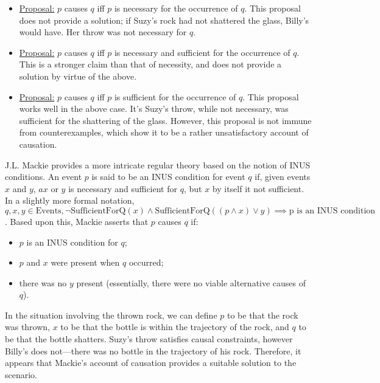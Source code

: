 \documentclass{article}
\begin{document}
    \begin{itemize}
    \item \underline{Proposal:} $p$ causes $q$ iff $p$ is necessary for the occurrence of $q$. \smallbreak
        This proposal does not provide a solution; if Suzy's rock had not shattered the glass, Billy's would have. Her throw was not necessary for $q$.
    \item \underline{Proposal:} $p$ causes $q$ iff $p$ is necessary and sufficient for the occurrence of $q$. \smallbreak
        This is a stronger claim than that of necessity, and does not provide a solution by virtue of the above.
    \item \underline{Proposal:} $p$ causes $q$ iff $p$ is sufficient for the occurrence of $q$. \smallbreak
        This proposal works well in the above case. It's Suzy's throw, while not necessary, was sufficient for the shattering of the glass. However, this proposal is not immune from counterexamples, which show it to be a rather unsatisfactory account of causation.
    \end{itemize}

J.L. Mackie provides a more intricate regular theory based on the notion of INUS conditions. An event $p$ is said to be an INUS condition for event $q$ if, given events $x$ and $y$, $ax$ or $y$ is necessary and sufficient for $q$, but $x$ by itself it not sufficient. In a slightly more formal notation, $q, x, y \in \text{Events}, \lnot\mathrm{SufficientForQ}(x) \land \mathrm{SufficientForQ}((p \land x) \lor y) \implies \text{p is an INUS condition}$. Based upon this, Mackie asserts that $p$ causes $q$ if:

    \begin{itemize}
    \item $p$ is an INUS condition for $q$;
    \item $p$ and $x$ were present when $q$ occurred;
    \item there was no $y$ present (essentially, there were no viable alternative causes of $q$).
    \end{itemize}

In the situation involving the thrown rock, we can define $p$ to be that the rock was thrown, $x$ to be that the bottle is within the trajectory of the rock, and $q$ to be that the bottle shatters. Suzy's throw satisfies causal constraints, however Billy's does not---there was no bottle in the trajectory of his rock. Therefore, it appears that Mackie's account of causation provides a suitable solution to the scenario.
\end{document}

